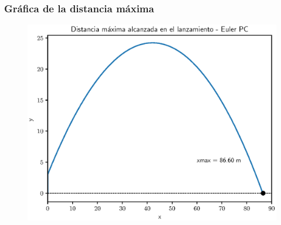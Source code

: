\documentclass[12pt]{beamer}
\begin{document}
\begin{frame}
\frametitle{Gráfica de la distancia máxima}
\begin{figure}
    \centering
    \includegraphics[scale=0.55]{Imagenes/plot_eulerPC_ejercicio_02_01.eps}
\end{figure}
\end{frame}
\end{document}
